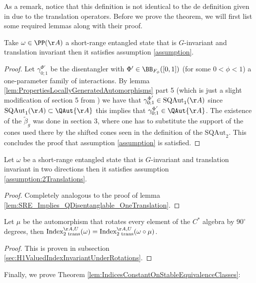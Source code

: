 As a remark, notice that this definition is not identical to the de definition given in \cite{Ogata2d} due to the translation operators. Before we prove the theorem, we will first list some required lemmas along with their proof.
\begin{lemma}\label{lem:SRE_Implies_QDisentanglable_OneTranslation}
	Take $\omega\in\PP(\AA)$ a short-range entangled state that is $G$-invariant and translation invariant then it satisfies assumption \ref{assumption}.
\end{lemma}
\begin{proof}
	Let $\gamma^{\Phi'}_{0;1}$ be the disentangler with $\Phi'\in\BB_{F_\phi}([0,1])$ (for some $0<\phi<1$) a one-parameter family of interactions. By lemma \ref{lem:PropertiesLocallyGeneratedAutomorphisms} part 5 (which is just a slight modification of section 5 from \cite{Ogata2d}) we have that $\gamma^{\Phi'}_{0;1}\in\textrm{SQAut}_1(\AA)$ since $\textrm{SQAut}_1(\AA)\subset\QAut{\AA}$ this implies that $\gamma^{\Phi'}_{0;1}\in\QAut{\AA}$. The existence of the $\tilde{\beta}_g$ was done in \cite{Ogata2d} section 3, where one has to substitute the support of the cones used there by the shifted cones seen in the definition of the $\textrm{SQAut}_2$. This concludes the proof that assumption \ref{assumption} is satisfied.
\end{proof}
\begin{lemma}\label{lem:SRE_Implies_QDisentanglable_TwoTranslations}
	Let $\omega$ be a short-range entangled state that is $G$-invariant and translation invariant in two directions then it satisfies assumption \ref{assumption:2Translations}.
\end{lemma}
\begin{proof}
	Completely analogous to the proof of lemma \ref{lem:SRE_Implies_QDisentanglable_OneTranslation}.
\end{proof}
\begin{lemma}\label{lem:RotationDoesn'tChangeH1Index}
	Let $\mu$ be the automorphism that rotates every element of the $C^*$ algebra by $90^\circ$ degrees, then $\textrm{Index}_{\text{2 trans}}^{\AA,U}(\omega)=\textrm{Index}_{\text{2 trans}}^{\AA,U}(\omega\circ\mu)$.
\end{lemma}
\begin{proof}
	This is proven in subsection \ref{sec:H1ValuedIndexInvariantUnderRotations}.
\end{proof}
Finally, we prove Theorem \ref{lem:IndicesConstantOnStableEquivalenceClasses}:
